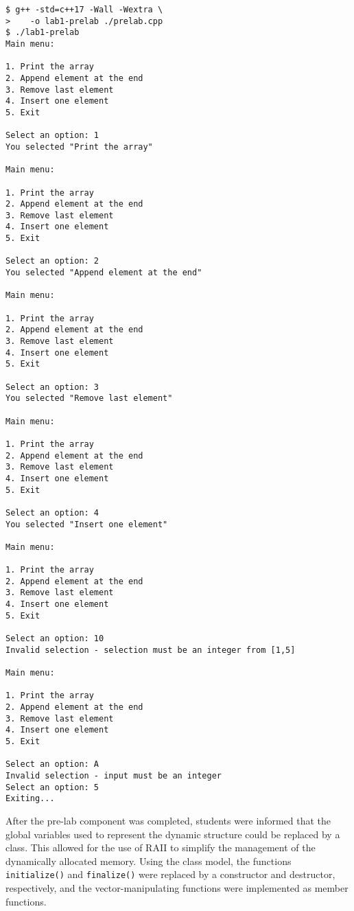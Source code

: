 \documentclass[11pt, letterpaper]{article} %
\begin{document}
\begin{multicols}{2}
\begin{lstlisting}[style=labreportstyle-sh]
$ g++ -std=c++17 -Wall -Wextra \
>    -o lab1-prelab ./prelab.cpp
$ ./lab1-prelab
Main menu:

1. Print the array
2. Append element at the end
3. Remove last element
4. Insert one element
5. Exit

Select an option: 1
You selected "Print the array"

Main menu:

1. Print the array
2. Append element at the end
3. Remove last element
4. Insert one element
5. Exit

Select an option: 2
You selected "Append element at the end"

Main menu:

1. Print the array
2. Append element at the end
3. Remove last element
4. Insert one element
5. Exit

Select an option: 3
You selected "Remove last element"

Main menu:

1. Print the array
2. Append element at the end
3. Remove last element
4. Insert one element
5. Exit

Select an option: 4
You selected "Insert one element"

Main menu:

1. Print the array
2. Append element at the end
3. Remove last element
4. Insert one element
5. Exit

Select an option: 10
Invalid selection - selection must be an integer from [1,5]

Main menu:

1. Print the array
2. Append element at the end
3. Remove last element
4. Insert one element
5. Exit

Select an option: A
Invalid selection - input must be an integer
Select an option: 5
Exiting...
\end{lstlisting}
\end{multicols}


After the pre-lab component was completed, students were informed that the global variables used to represent the dynamic structure could be replaced by a class. This allowed for the use of RAII \cite{cppreference-raii} to simplify the management of the dynamically allocated memory. Using the class model, the functions \texttt{initialize()} and \texttt{finalize()} were replaced by a constructor and destructor, respectively, and the vector-manipulating functions were implemented as member functions.
\end{document}
